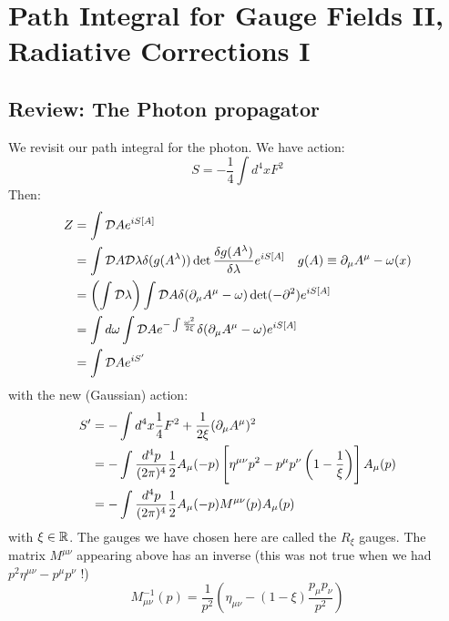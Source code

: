 \section{Path Integral for Gauge Fields II, Radiative Corrections I}

\subsection{Review: The Photon propagator}
We revisit our path integral for the photon. We have action:
\begin{equation}
    S = -\frac{1}{4}\int d^4x F^2
\end{equation}
Then:
\begin{equation}
    \begin{split}
        Z &= \int \mathcal{D}A e^{iS[A]}
        \\ &= \int \mathcal{D}A\mathcal{D}\lambda \delta(g(A^\lambda))\det \frac{\delta g(A^\lambda)}{\delta \lambda}e^{iS[A]} \quad g(A) \equiv \partial_\mu A^\mu - \omega(x)
        \\ &= \left(\int \mathcal{D}\lambda\right)\int \mathcal{D}A\delta(\partial_\mu A^\mu - \omega)\det(-\partial^2)e^{iS[A]}
        \\ &= \int d\omega \int \mathcal{D}Ae^{-\int \frac{\omega^2}{2\xi}}\delta(\partial_\mu A^\mu - \omega)e^{iS[A]}
        \\ &= \int \mathcal{D}A e^{iS'}
    \end{split}
\end{equation}
with the new (Gaussian) action:
\begin{equation}
    \begin{split}
        S' &= -\int d^4x\frac{1}{4}F^2 + \frac{1}{2\xi}(\partial_\mu A^\mu)^2
        \\ &= -\int \frac{d^4p}{(2\pi)^4}\frac{1}{2}A_\mu(-p)\left[\eta^{\mu\nu}p^2 - p^\mu p^\nu\left(1 - \frac{1}{\xi}\right)\right]A_\mu(p)
        \\ &= -\int \frac{d^4p}{(2\pi)^4}\frac{1}{2}A_\mu(-p)M^{\mu\nu}(p)A_\mu(p)
    \end{split}
\end{equation}
with $\xi \in \mathbb{R}$. The gauges we have chosen here are called the $R_\xi$ gauges. The matrix $M^{\mu\nu}$ appearing above has an inverse (this was not true when we had $p^2 \eta^{\mu\nu} - p^\mu p^\nu$ !)
\begin{equation}
    M^{-1}_{\mu\nu}(p) = \frac{1}{p^2}\left(\eta_{\mu\nu} - (1-\xi)\frac{p_\mu p_\nu}{p^2}\right)
\end{equation}
